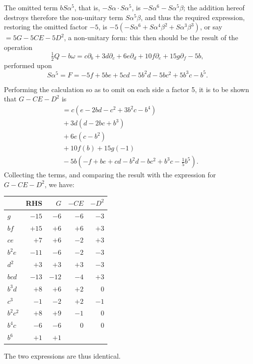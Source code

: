 \documentclass[11pt]{article}
\begin{document}
The omitted term $bS\alpha^5$, that is, $-S\alpha\cdot S\alpha^5$, is $-S\alpha^6 - S\alpha^5\beta$; the addition hereof destroys therefore the non-unitary term $S\alpha^5\beta$, and thus the required expression, restoring the omitted factor $-5$, is $-5(-S\alpha^6 + S\alpha^4\beta^2 + S\alpha^3\beta^3)$, or say $= 5G - 5CE - 5D^2$, a non-unitary form: this then should be the result of the operation
\[
\tfrac{1}{2}Q - b\omega = c\partial_b + 3d\partial_c + 6e\partial_d + 10f\partial_e + 15g\partial_f - 5b,
\]
performed upon
\[
S\alpha^5 = F = -5f + 5be + 5cd - 5b^2d - 5bc^2 + 5b^3c - b^5.
\]

Performing the calculation so as to omit on each side a factor 5, it is to be shown that $G - CE - D^2$ is
\begin{align*}
& = c(e - 2bd - c^2 + 3b^2c - b^4) \\
& {} + 3d(d - 2bc + b^3) \\
& {} + 6e(c - b^2) \\
& {} + 10f(b)+ 15g(-1) \\
& {} - 5b(-f + be + cd - b^2d - bc^2 + b^3c - \tfrac{1}{5}b^5).
\end{align*}
Collecting the terms, and comparing the result with the expression for $G - CE - D^2$, we have:

\begin{center}
\begin{tabular}{l|rrrr}
 & RHS & $G$ & $-CE$ & $-D^2$ \\
\hline
$g$ & $-15$ & $-6$ & $-6$ & $-3$ \\
$bf$ & $+15$ & $+6$ & $+6$ & $+3$ \\
$ce$ & $+7$ & $+6$ & $-2$ & $+3$ \\
$b^2e$ & $-11$ & $-6$ & $-2$ & $-3$ \\
$d^2$ & $+3$ & $+3$ & $+3$ & $-3$ \\
$bcd$ & $-13$ & $-12$ & $-4$ & $+3$ \\
$b^3d$ & $+8$ & $+6$ & $+2$ & $0$ \\
$c^3$ & $-1$ & $-2$ & $+2$ & $-1$ \\
$b^2c^2$ & $+8$ & $+9$ & $-1$ & $0$ \\
$b^4c$ & $-6$ & $-6$ & $0$ & $0$ \\
$b^6$ & $+1$ & $+1$ & & \\
\end{tabular}
\end{center}

The two expressions are thus identical.
\end{document}
